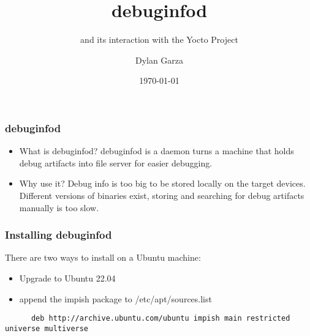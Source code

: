 \documentclass[12pt]{beamer}
\title{debuginfod}
\subtitle{and its interaction with the 
Yocto Project}
\author{Dylan Garza}
\date{\today}
\begin{document}
\frame{\titlepage}

\begin{frame}
   \frametitle{debuginfod}
   \begin{itemize}
      \item What is debuginfod?
      debuginfod is a daemon turns a machine that
      holds debug artifacts into file server for
      easier debugging. \\
      \vspace{.5cm}
      \item Why use it?
      Debug info is too big to be stored locally
      on the target devices. Different versions 
      of binaries exist, storing and searching 
      for debug artifacts manually is too slow.
   \end{itemize}
\end{frame}

\begin{frame}[fragile]
   \frametitle{Installing debuginfod}
   There are two ways to install on a Ubuntu machine:
   \begin{itemize}
      \item Upgrade to Ubuntu 22.04
      \item append the impish package to /etc/apt/sources.list
   \end{itemize}
   \begin{verbatim}
      deb http://archive.ubuntu.com/ubuntu impish main restricted universe multiverse
   \end{verbatim}

\end{frame}
\end{document}
